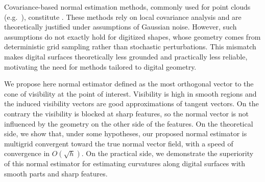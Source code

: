     Covariance-based normal estimation methods, commonly used for
    point clouds (e.g.\ \cite{mitra:2003-acm}),  constitute . These methods rely on local covariance analysis
    and are theoretically justified under assumptions of Gaussian
    noise. However, such assumptions do not exactly hold for digitized shapes,
    whose geometry comes from deterministic grid sampling rather than
    stochastic perturbations. This mismatch makes  digital surfaces theoretically less
    grounded and practically less reliable, motivating the need for
    methods tailored to digital geometry.


    We propose here  normal estimator defined as the most orthogonal
    vector to the cone of visibility at the point of interest.
    Visibility is high in smooth regions and the induced visibility
    vectors are good approximations of tangent vectors. On the
    contrary the visibility is blocked at sharp features, so the
    normal vector is not influenced by the geometry on the other side
    of the features. On the theoretical side, we show that, under some
    hypotheses, our proposed normal estimator is multigrid convergent
    toward the true normal vector field, with a speed of convergence
    in $O(\sqrt{h})$. On the practical side, we demonstrate the
    superiority of this normal estimator for estimating curvatures
    along digital surfaces with smooth parts and sharp features.

